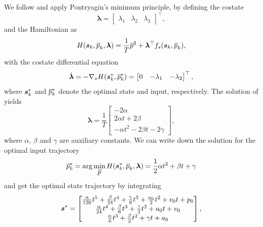 We follow \cite{MuellerHehn15} and apply Pontryagin's minimum principle, by defining the costate
\begin{equation}
	\bm{\lambda} =
	\begin{bmatrix}
		\lambda_1 & \lambda_2 & \lambda_3
	\end{bmatrix}^\top
	,
\end{equation}
and the Hamiltonian as
\begin{equation}
	H(\mbox{$\bm{s}$}_k,\mbox{$\dddot{p}$}_k, \bm{\lambda}) = \frac{1}{T} \mbox{$\dddot{p}$}^2
	+ \bm{\lambda}^\top f_s(\mbox{$\bm{s}$}_k, \mbox{$\dddot{p}$}_k)
	,
\end{equation}
with the costate differential equation
\begin{equation}
	\label{eq:costate-differential-equation}
	\dot{\bm{\lambda}} = -\nabla_s H(\mbox{$\bm{s}$}_k^*, \mbox{$\dddot{p}$}_k^*) = 
	\begin{bmatrix}
		0 & -\lambda_1 & -\lambda_2
	\end{bmatrix}^\top
	,
\end{equation}
where $\mbox{$\bm{s}$}_k^*$ and $\mbox{$\dddot{p}$}_k^*$ denote the optimal state and input, respectively. The solution of  yields
\begin{equation}
	\bm{\lambda} = \frac{1}{T}
	\begin{bmatrix}
		- 2 \alpha \\
		2 \alpha t + 2 \beta \\
		- \alpha t^2 - 2 \beta t - 2\gamma
	\end{bmatrix},
\end{equation}
where $\alpha$, $\beta$ and $\gamma$ are auxiliary constants.
We can write down the solution for the optimal input trajectory
\begin{equation}
	\label{eq:input-optimal-trajectory}
	\mbox{$\dddot{p}$}_k^* = \arg\min_{\mbox{$\dddot{p}$}}H(\mbox{$\bm{s}$}_k^*,\mbox{$\dddot{p}$}_k, \bm{\lambda}) = 
	\frac{1}{2}\alpha t^2 + \beta t + \gamma
\end{equation}
and get the optimal state trajectory by integrating 
\begin{equation}
	\label{eq:optimal-trajectory-per-axis}
	\mbox{$\bm{s}$}^* = 
	\begin{bmatrix}
		\frac{\alpha}{120}t^5
		+ \frac{\beta}{24}t^4
		+ \frac{\gamma}{6}t^3
		+ \frac{a_0}{2}t^2
		+ v_0 t
		+ p_0
		\\
		\frac{\alpha}{24} t^4
		+ \frac{\beta}{6} t^3
		+ \frac{\gamma}{2} t^2
		+ a_0 t
		+ v_0
		\\
		\frac{\alpha}{6} t^3
		+ \frac{\beta}{2} t^2
		+ \gamma t
		+ a_0
	\end{bmatrix}
	,
\end{equation}
